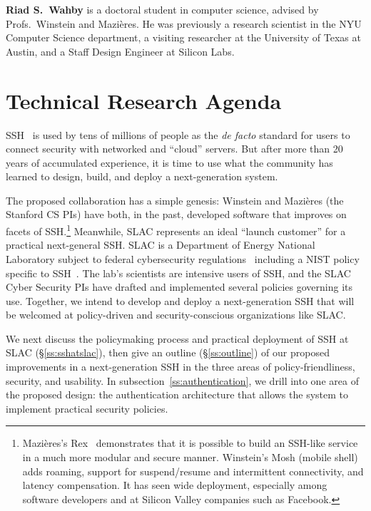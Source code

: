 \documentclass[10pt]{article}
\newcommand{\slim}{\vspace{0.5\baselineskip}}
\begin{document}
\slim

\noindent \textbf{Riad S.~Wahby} is a doctoral student in computer science,
advised by Profs.~Winstein and Mazi\`{e}res. He was previously a
research scientist in the NYU Computer Science department, a
visiting researcher at the University of Texas at Austin, and a Staff
Design Engineer at Silicon Labs.

\section{Technical Research Agenda}

SSH~\cite{SSH} is used by tens of millions of people as the \emph{de
  facto} standard for users to connect security with networked and
``cloud'' servers. But after more than 20 years of accumulated
experience, it is time to use what the community has
learned to design, build, and deploy a next-generation system.

The proposed collaboration has a simple genesis: Winstein and
Mazi\`{e}res (the Stanford CS PIs) have both, in the past, developed
software that improves on facets of SSH.\footnote{Mazi\`{e}res's
  Rex~\cite{rex} demonstrates that it is possible to build an SSH-like
  service in a much more modular and secure manner. Winstein's Mosh
  (mobile shell)~\cite{Mosh} adds roaming, support for suspend/resume
  and intermittent connectivity, and latency compensation. It has seen
  wide deployment, especially among software developers and at Silicon
  Valley companies such as Facebook.} Meanwhile, SLAC represents an
ideal ``launch customer'' for a practical next-general SSH. SLAC is a
Department of Energy National Laboratory subject to federal
cybersecurity regulations~\cite{cyberframework, nist80053, trumpeo}
including a NIST policy specific to SSH~\cite{nistSSH}.  The lab's
scientists are intensive users of SSH, and the SLAC Cyber Security PIs
have drafted and implemented several policies governing its
use. Together, we intend to develop and deploy a next-generation SSH
that will be welcomed at policy-driven and security-conscious
organizations like SLAC.

We next discuss the policymaking process and practical deployment of
SSH at SLAC (\S\ref{ss:sshatslac}), then give an outline
(\S\ref{ss:outline}) of our proposed improvements in a next-generation
SSH in the three areas of policy-friendliness, security, and
usability. In subsection~\ref{ss:authentication}, we drill into one
area of the proposed design: the authentication architecture that
allows the system to implement practical security policies.
\end{document}
